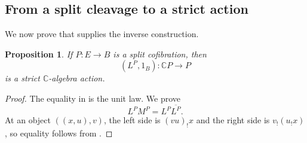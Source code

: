 \documentclass[11pt]{article}
\theoremstyle{plain}
\newtheorem{proposition}[theorem]{Proposition}
\theoremstyle{definition}
\theoremstyle{remark}
\newcommand{\C}{\mathbb{C}}
\numberwithin{equation}{section}
\begin{document}
\subsection{From a split cleavage to a strict action}

We now prove that  supplies the inverse
construction.

\begin{proposition}\label{prop:splitting-gives-algebra}
If $P\colon E\to B$ is a split cofibration, then
\begin{equation*}
(L^{P},1_B)\colon\C P\longrightarrow P
\end{equation*}
is a strict $\C$-algebra action.
\end{proposition}

\begin{proof}
The equality in  is the unit law.  We prove
\begin{equation}
L^{P}M^{P}=L^{P}\overline{L^{P}}.
  \label{eq:LP-multiplication}
\end{equation}
At an object $((x,u),v)$, the left side is $(vu)_{!}x$ and the right
side is $v_{!}(u_{!}x)$, so equality follows from
.


\end{proof}
\end{document}
